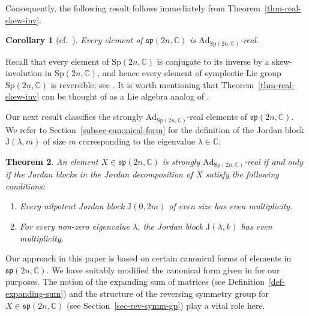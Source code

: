 \documentclass[11pt,reqno]{amsart}
\numberwithin{equation}{section}
\newtheorem{theorem}{Theorem}[section]
\newtheorem{corollary}[theorem]{Corollary}
\theoremstyle{definition}
\def\C{\mathbb C}
\def\C{\mathbb {C}}
\newcommand{\defref}[1]{Definition~\ref{#1}}
\newcommand{\secref}[1]{Section~\ref{#1}}
\newcommand{\thmref}[1]{Theorem~\ref{#1}}
\begin{document}
Consequently, the following result follows immediately from  \thmref{thm-real-skew-inv}. 


\begin{corollary} [cf.~{\cite[Theorem 4.2]{GM2}}] \label{cor-real-sp(2n,C)} 
	Every element of $\mathfrak{sp}(2n,\mathbb{C})$ is $\mathrm{Ad}_{\mathrm{Sp}(2n,\mathbb{C})}$-real.
\end{corollary}



Recall	 that  every element of $\mathrm{Sp}(2n,\mathbb{C})$ is conjugate to its inverse by a skew-involution in $\mathrm{Sp}(2n,\mathbb{C})$, and hence every element of symplectic Lie group $\mathrm{Sp}(2n,\mathbb{C})$ is reversible; see  \cite[Theorem 5.6]{JP}. 
It is worth mentioning that  \thmref{thm-real-skew-inv} can be thought of as a Lie algebra analog of \cite[Theorem 5.6]{JP}. 



Our next  result  classifies the strongly $\mathrm{Ad}_{\mathrm{Sp}(2n,\mathbb{C})}$-real elements of $\mathfrak{sp}(2n,\mathbb{C})$.  We refer to \secref{subsec-canonical-form} for the definition of the Jordan block $ \mathrm{J}(\lambda, m)$ of size $m$ corresponding to the eigenvalue $\lambda \in \C$. 
\begin{theorem}\label{thm-main-str-real-sp(2n,C)}
	An element $X \in \mathfrak{sp}(2n,\mathbb{C})$ is strongly $\mathrm{Ad}_{\mathrm{Sp}(2n,\mathbb{C})}$-real  if and only if the Jordan blocks in the Jordan decomposition of  $X$ satisfy the following conditions:
	\begin{enumerate}
		\item \label{cond-1-main-thm}
		Every nilpotent Jordan block  $ \mathrm{J}(0, 2m)$ of even size has even multiplicity.
		
		\item\label{cond-2-main-thm} For every non-zero eigenvalue $\lambda$, the Jordan block $ \mathrm{J}(\lambda, k)$ has even multiplicity.
	\end{enumerate}
\end{theorem}


Our approach in this paper is based on certain canonical forms of elements in $\mathfrak{sp}(2n,\mathbb{C})$. 
We have suitably modified the canonical form given in \cite[Lemma 6]{Cr} for our purposes. The notion of the expanding sum of matrices (see \defref{def-expanding-sum}) and the structure of the reversing symmetry group for $X \in \mathfrak{sp}(2n,\mathbb{C})$ (see \secref{sec-rev-symm-gp}) play a vital role here.
\end{document}
